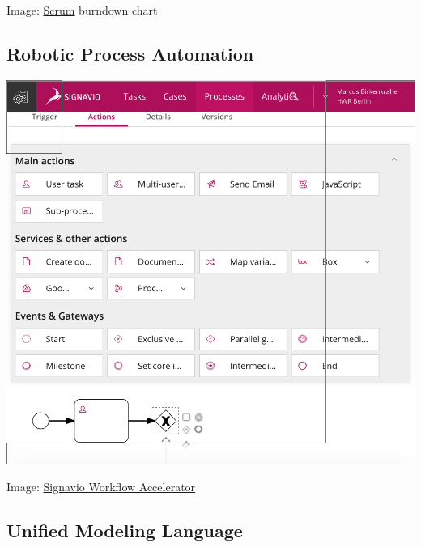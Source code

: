 \documentclass[11pt]{article}
\begin{document}
Image: \href{https://www.scrum.org/}{Scrum} burndown chart

\subsection*{Robotic Process Automation}
\label{sec:org48d8774}

\begin{center}
\includegraphics[width=.9\linewidth]{./img/rpa.png}
\end{center}

Image: \href{https://www.signavio.com/products/workflow-accelerator/}{Signavio Workflow Accelerator}

\subsection*{Unified Modeling Language}
\label{sec:orgb3e099f}
\end{document}
